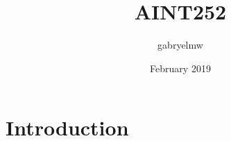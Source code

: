 \documentclass{article}
\title{AINT252}
\author{gabryelmw }
\date{February 2019}
\begin{document}
\maketitle

\section{Introduction}
\end{document}
